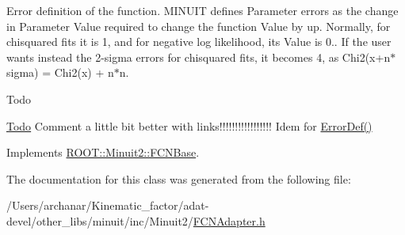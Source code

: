 Error definition of the function. M\+I\+N\+U\+IT defines Parameter errors as the change in Parameter Value required to change the function Value by up. Normally, for chisquared fits it is 1, and for negative log likelihood, its Value is 0.. If the user wants instead the 2-\/sigma errors for chisquared fits, it becomes 4, as Chi2(x+n$\ast$sigma) = Chi2(x) + n$\ast$n.

\begin{DoxyRefDesc}{Todo}
\item[\mbox{\hyperlink{todo__todo000001}{Todo}}]Comment a little bit better with links!!!!!!!!!!!!!!!!! Idem for \mbox{\hyperlink{classROOT_1_1Minuit2_1_1FCNBase_ac4592475c58a65b037ba97ab5f3cba10}{Error\+Def()}}\end{DoxyRefDesc}


Implements \mbox{\hyperlink{classROOT_1_1Minuit2_1_1FCNBase_a04ef08ddad92ce8d89d498efbe021c39}{R\+O\+O\+T\+::\+Minuit2\+::\+F\+C\+N\+Base}}.



The documentation for this class was generated from the following file\+:\begin{DoxyCompactItemize}
\item 
/\+Users/archanar/\+Kinematic\+\_\+factor/adat-\/devel/other\+\_\+libs/minuit/inc/\+Minuit2/\mbox{\hyperlink{adat-devel_2other__libs_2minuit_2inc_2Minuit2_2FCNAdapter_8h}{F\+C\+N\+Adapter.\+h}}\end{DoxyCompactItemize}
